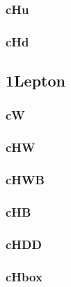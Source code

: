\documentclass[landscape, 12pt,letterpaper]{article}
\begin{document}
\newpage

\subsubsection{cHu}


\newpage

\subsubsection{cHd}


\newpage

\newpage

\subsection{1Lepton }
\subsubsection{cW}


\newpage

\subsubsection{cHW}


\newpage

\subsubsection{cHWB}


\newpage

\subsubsection{cHB}


\newpage

\subsubsection{cHDD}


\newpage

\subsubsection{cHbox}

\end{document}
